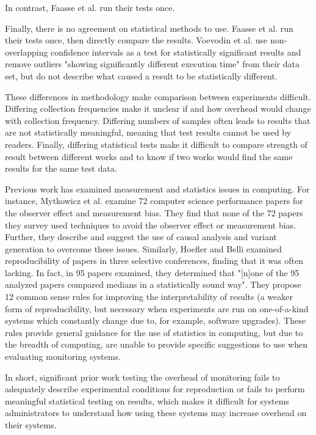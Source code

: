 \documentclass[conference]{IEEEtran}
\begin{document}
In contrast, Faasse et al. \cite{faasseOutBandPerformance2020}
run their tests once.

Finally, there is no agreement on statistical methods to use. Faasse et al.\cite{faasseOutBandPerformance2020}
run their tests once, then directly compare the results. 
Voevodin et al.\cite{voevodinOverheadAnalysisPerformance2022} use 
non-overlapping confidence intervals as a test for statistically 
significant results and remove outliers "showing significantly different 
execution time" from their data set, but do not describe what 
caused a result to be statistically different.

These differences in methodology make comparison between experiments
difficult. Differing collection frequencies make it unclear if and how
overhead would change with collection frequency. Differing numbers of 
samples often leads to results that are not statistically meaningful,
meaning that test results cannot be used by readers. Finally, differing
statistical tests make it difficult to compare strength of result 
between different works and to know if two works would find the same
results for the same test data.

Previous work has examined measurement and statistics issues in computing. For 
instance, Mytkowicz et al. \cite{mytkowiczObserverEffectMeasurement2008} examine
72 computer science performance papers for the observer effect and measurement bias.
They find that none of the 72 papers they survey used techniques to avoid the observer 
effect or measurement bias. Further, they describe and suggest the use of causal
analysis and variant generation to overcome these issues. Similarly, Hoefler and Belli
\cite{hoeflerScientificBenchmarkingParallel2015} examined reproducibility of papers 
in three selective conferences, finding that it was often lacking. In fact, in 95
papers examined, they determined that "[n]one of the 95 analyzed papers compared 
medians in a statistically sound way". They propose 12 common sense rules for 
improving the interpretability of results (a weaker form of reproducibility, but 
necessary when experiments are run on one-of-a-kind systems which constantly 
change due to, for example, software upgrades). These rules provide general 
guidance for the use of statistics in computing, but due to the breadth of 
computing, are unable to provide specific suggestions to use when evaluating
monitoring systems.

In short, significant prior work testing the overhead of monitoring fails to 
adequately describe experimental conditions for reproduction or fails to 
perform meaningful statistical testing on results, which makes it difficult for 
systems administrators to understand how using these systems may increase 
overhead on their systems.
\end{document}
